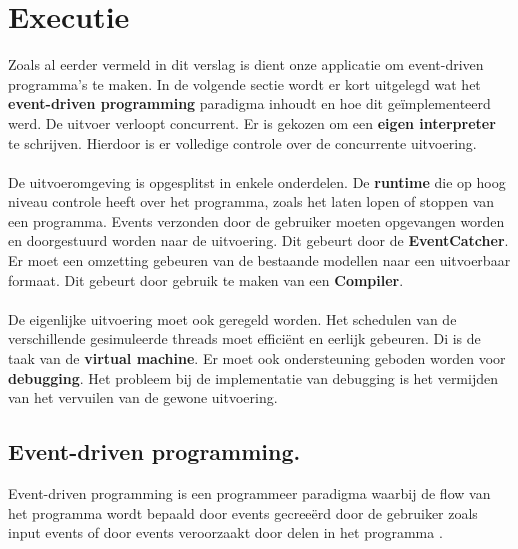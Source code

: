 \documentclass[]{article}
\begin{document}
\section{Executie}
\label{Algoritme}
Zoals al eerder vermeld in dit verslag is dient onze applicatie om event-driven programma's te maken. In de volgende sectie wordt er kort uitgelegd wat het \textbf{event-driven programming} paradigma inhoudt en hoe dit ge\"{i}mplementeerd werd. De uitvoer verloopt concurrent. Er is gekozen om een \textbf{eigen interpreter} te schrijven. Hierdoor is er volledige controle over de concurrente uitvoering.  \\\\
De uitvoeromgeving is opgesplitst in enkele onderdelen. De \textbf{runtime} die op hoog niveau controle heeft over het programma, zoals het laten lopen of stoppen van een programma. Events verzonden door de gebruiker moeten opgevangen worden en doorgestuurd worden naar de uitvoering. Dit gebeurt door de \textbf{EventCatcher}. Er moet een omzetting gebeuren van de bestaande modellen naar een uitvoerbaar formaat. Dit gebeurt door gebruik te maken van een \textbf{Compiler}. \\\\
De eigenlijke uitvoering moet ook geregeld worden. Het schedulen van de verschillende gesimuleerde threads moet effici\"ent en eerlijk gebeuren. Di is de taak van de \textbf{virtual machine}. Er moet ook ondersteuning geboden worden voor \textbf{debugging}. Het probleem bij de implementatie van debugging is het vermijden van het vervuilen van de gewone uitvoering. 
\subsection{Event-driven programming.}
Event-driven programming is een programmeer paradigma waarbij de flow van het programma wordt bepaald door events gecree\"{e}rd door de gebruiker zoals input events of door events veroorzaakt door delen in het programma \cite{eventdrivenwiki}.
\end{document}
